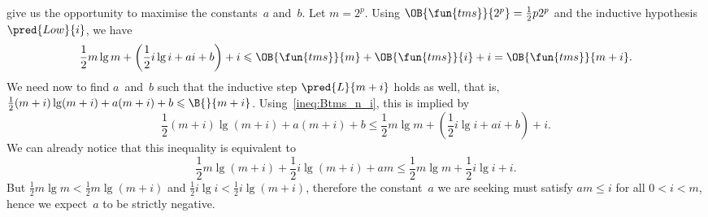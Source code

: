 give us the opportunity to maximise the constants~\(a\)
and~\(b\). Let \(m=2^p\). Using
\(\OB{\fun{tms}}{2^p} = \tfrac{1}{2}p2^p\) and the inductive
hypothesis \(\pred{Low}{i}\), we have
\begin{equation}
\frac{1}{2}m\lg m + \left(\frac{1}{2}i\lg i + ai + b\right) + i
\leqslant
\OB{\fun{tms}}{m} + \OB{\fun{tms}}{i} + i = \OB{\fun{tms}}{m+i}.
\label{ineq:Btms_n_i}
\end{equation}
We need now to find \(a\)~and~\(b\) such that the inductive step
\(\pred{L}{m+i}\) holds as well, that is,
\(\tfrac{1}{2}(m+i)\lg(m+i) + a(m+i) + b \leqslant \B{}{m+i}\).
Using~\eqref{ineq:Btms_n_i}, this is implied by
\begin{equation*}
\frac{1}{2}(m+i)\lg(m+i) + a(m+i) + b
\leqslant
\frac{1}{2}m\lg m + \left(\frac{1}{2}i\lg i + ai + b\right) + i.
\end{equation*}
We can already notice that this inequality is equivalent to
\begin{equation}
\frac{1}{2}m\lg(m+i) + \frac{1}{2}i\lg(m+i) + am
\leqslant \frac{1}{2}m\lg m + \frac{1}{2}i\lg i + i.
\label{ineq:Btms_n_i_details}
\end{equation}
But \(\tfrac{1}{2}m\lg m < \tfrac{1}{2}m\lg(m+i)\) and
\(\tfrac{1}{2}i\lg i < \tfrac{1}{2}i\lg(m+i)\), therefore the
constant~\(a\) we are seeking must satisfy \(am \leqslant i\) for all
\(0 < i < m\), hence we expect~\(a\) to be strictly negative.


